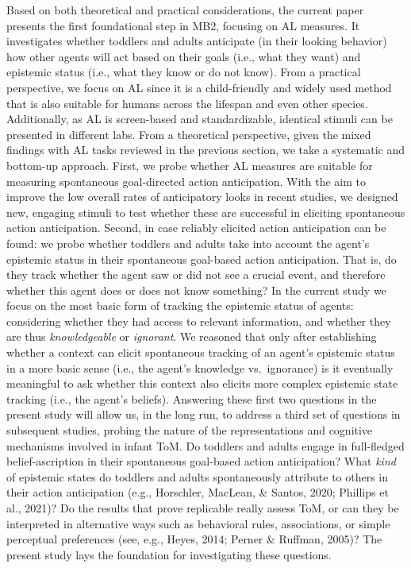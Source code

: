 \documentclass[
  man,floatsintext]{apa6}
\begin{document}
Based on both theoretical and practical considerations, the current paper presents the first foundational step in MB2, focusing on AL measures. It investigates whether toddlers and adults anticipate (in their looking behavior) how other agents will act based on their goals (i.e., what they want) and epistemic status (i.e., what they know or do not know). From a practical perspective, we focus on AL since it is a child-friendly and widely used method that is also suitable for humans across the lifespan and even other species. Additionally, as AL is screen-based and standardizable, identical stimuli can be presented in different labs. From a theoretical perspective, given the mixed findings with AL tasks reviewed in the previous section, we take a systematic and bottom-up approach.
First, we probe whether AL measures are suitable for measuring spontaneous goal-directed action anticipation. With the aim to improve the low overall rates of anticipatory looks in recent studies, we designed new, engaging stimuli to test whether these are successful in eliciting spontaneous action anticipation. Second, in case reliably elicited action anticipation can be found: we probe whether toddlers and adults take into account the agent's epistemic status in their spontaneous goal-based action anticipation. That is, do they track whether the agent saw or did not see a crucial event, and therefore whether this agent does or does not know something? In the current study we focus on the most basic form of tracking the epistemic status of agents: considering whether they had access to relevant information, and whether they are thus \emph{knowledgeable} or \emph{ignorant}. We reasoned that only after establishing whether a context can elicit spontaneous tracking of an agent's epistemic status in a more basic sense (i.e., the agent's knowledge vs.~ignorance) is it eventually meaningful to ask whether this context also elicits more complex epistemic state tracking (i.e., the agent's beliefs).
Answering these first two questions in the present study will allow us, in the long run, to address a third set of questions in subsequent studies, probing the nature of the representations and cognitive mechanisms involved in infant ToM. Do toddlers and adults engage in full-fledged belief-ascription in their spontaneous goal-based action anticipation? What \emph{kind} of epistemic states do toddlers and adults spontaneously attribute to others in their action anticipation (e.g., Horschler, MacLean, \& Santos, 2020; Phillips et al., 2021)? Do the results that prove replicable really assess ToM, or can they be interpreted in alternative ways such as behavioral rules, associations, or simple perceptual preferences (see, e.g., Heyes, 2014; Perner \& Ruffman, 2005)? The present study lays the foundation for investigating these questions.
\end{document}
